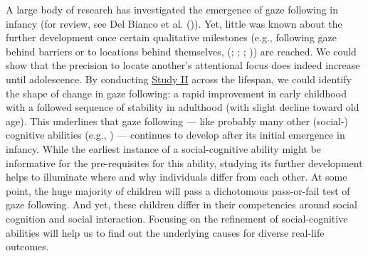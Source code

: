 \documentclass[
]{scrbook}
\begin{document}
A large body of research has investigated the emergence of gaze following in infancy (for review, see Del Bianco et al. ()). Yet, little was known about the further development once certain qualitative milestones (e.g., following gaze behind barriers or to locations behind themselves, (; ; ; )) are reached. We could show that the precision to locate another's attentional focus does indeed increase until adolescence. By conducting \hyperref[studyII]{Study II} across the lifespan, we could identify the shape of change in gaze following: a rapid improvement in early childhood with a followed sequence of stability in adulthood (with slight decline toward old age). This underlines that gaze following --- like probably many other (social-) cognitive abilities (e.g., ) --- continues to develop after its initial emergence in infancy. While the earliest instance of a social-cognitive ability might be informative for the pre-requisites for this ability, studying its further development helps to illuminate where and why individuals differ from each other. At some point, the huge majority of children will pass a dichotomous pass-or-fail test of gaze following. And yet, these children differ in their competencies around social cognition and social interaction. Focusing on the refinement of social-cognitive abilities will help us to find out the underlying causes for diverse real-life outcomes.
\end{document}
